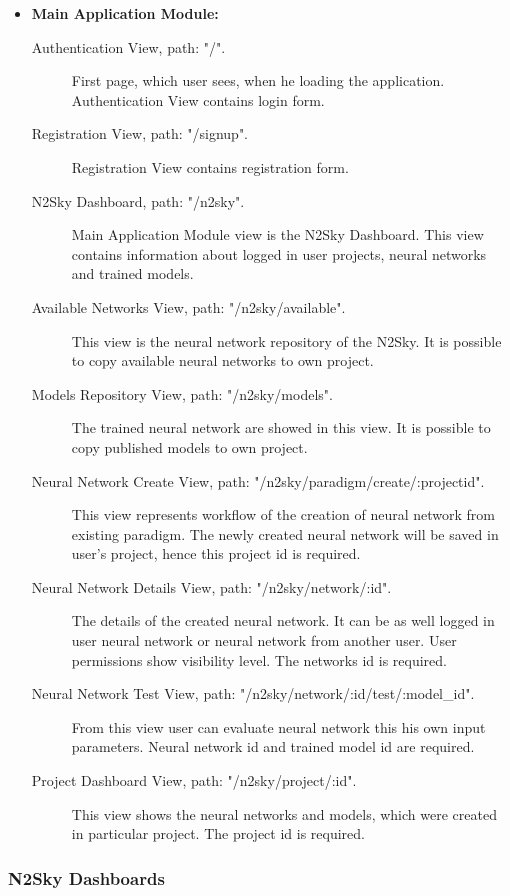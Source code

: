 \begin{itemize}
\item \textbf{Main Application Module:}
\begin{description}
\item[Authentication View, path: "/".] First page, which user sees, when he loading the application.  Authentication View contains login form.
\item[Registration View, path: "/signup".] Registration View contains registration form.
 \item[N2Sky Dashboard, path: "/n2sky".] Main Application Module view is the N2Sky Dashboard. This view contains information about logged in user projects, neural networks and trained models.  
\item[Available Networks View, path: "/n2sky/available".] This view is the neural network repository of the N2Sky. It is possible to copy available neural networks to own project.
\item[Models Repository View, path: "/n2sky/models".] The trained neural network are showed in this view. It is possible to copy published models to own project.
\item[Neural Network Create View, path: "/n2sky/paradigm/create/:projectid".] This view represents workflow of the creation of neural network from existing paradigm. The newly created neural network will be saved in user's project, hence this project id is required.  
\item[Neural Network Details View, path: "/n2sky/network/:id".] The details of the created neural network. It can be as well logged in user neural network or neural network from another user. User permissions show visibility level. The networks id is required. 
\item[Neural Network Test View, path: "/n2sky/network/:id/test/:model\_id".] From this view user can evaluate neural network this his own input parameters. Neural network id and trained model id are required. 
\item[Project Dashboard View, path: "/n2sky/project/:id".] This view shows the neural networks and models, which were created in particular project. The project id is required.
\end{description}


\end{itemize}






\subsubsection{N2Sky Dashboards}\label{N2Sky Dashboards}

